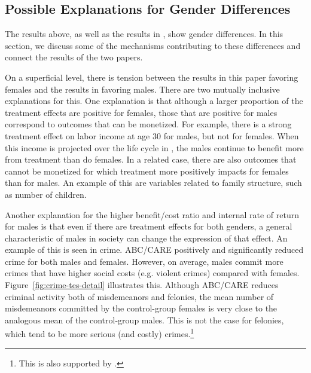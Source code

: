 \subsection{Possible Explanations for Gender Differences}

The results above, as well as the results in \citet{Garcia_Heckman_Leaf_etal_2017_Comp_CBA_Unpublished}, show gender differences. In this section, we discuss some of the mechanisms contributing to these differences and connect the results of the two papers. 

On a superficial level, there is tension between the results in this paper favoring females and the results in \citet{Garcia_Heckman_Leaf_etal_2017_Comp_CBA_Unpublished} favoring males. There are two mutually inclusive explanations for this. One explanation is that although a larger proportion of the treatment effects are positive for females, those that are positive for males correspond to outcomes that can be monetized. For example, there is a strong treatment effect on labor income at age 30 for males, but not for females. When this income is projected over the life cycle in \citet{Garcia_Heckman_Leaf_etal_2017_Comp_CBA_Unpublished}, the males continue to benefit more from treatment than do females. In a related case, there are also outcomes that cannot be monetized for which treatment more positively impacts for females than for males. An example of this are variables related to family structure, such as number of children. 

Another explanation for the higher benefit/cost ratio and internal rate of return for males is that even if there are treatment effects for both genders, a general characteristic of males in society can change the expression of that effect. An example of this is seen in crime. ABC/CARE positively and significantly reduced crime for both males and females. However, on average, males commit more crimes that have higher social costs (e.g. violent crimes) compared with females. Figure~\ref{fig:crime-tes-detail} illustrates this. Although ABC/CARE reduces criminal activity both of misdemeanors and felonies, the mean number of misdemeanors committed by the control-group females is very close to the analogous mean of the control-group males. This is not the case for felonies, which tend to be more serious (and costly) crimes.\footnote{This is also supported by \citet{Cohen-Bowles_2010_Estimating-Cost-Crime,Gregg_etal_2015_SocialRealities_BOOK,UDOJ_2016_PrisonersStatistics_Bulletin}.} 

